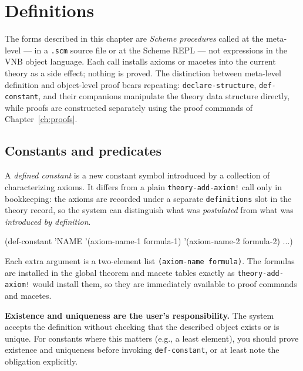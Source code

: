 \chapter{Definitions}

The forms described in this chapter are \emph{Scheme procedures} called
at the meta-level --- in a \texttt{.scm} source file or at the Scheme
REPL --- not expressions in the VNB object language.  Each call installs
axioms or macetes into the current theory as a side effect; nothing is
proved.  The distinction between meta-level definition and object-level
proof bears repeating: \texttt{declare-structure}, \texttt{def-constant},
and their companions manipulate the theory data structure directly, while
proofs are constructed separately using the proof commands of
Chapter~\ref{ch:proofs}.

\section{Constants and predicates}
\label{sec:def-constant}

A \emph{defined constant} is a new constant symbol introduced by a
collection of characterizing axioms.  It differs from a plain
\texttt{theory-add-axiom!} call only in bookkeeping: the axioms are
recorded under a separate \texttt{definitions} slot in the theory record,
so the system can distinguish what was \emph{postulated} from what was
\emph{introduced by definition}.

\begin{VNBcode}
(def-constant 'NAME
  '(axiom-name-1 formula-1)
  '(axiom-name-2 formula-2)
  ...)
\end{VNBcode}

\begin{sloppypar}Each extra argument is a two-element list \texttt{(axiom-name formula)}.
The formulas are installed in the global theorem and macete tables exactly
as \texttt{theory-add-axiom!} would install them, so they are immediately
available to proof commands and macetes.\end{sloppypar}

\textbf{Existence and uniqueness are the user's responsibility.}  The
system accepts the definition without checking that the described object
exists or is unique.  For constants where this matters (e.g., a least
element), you should prove existence and uniqueness before invoking
\texttt{def-constant}, or at least note the obligation explicitly.

